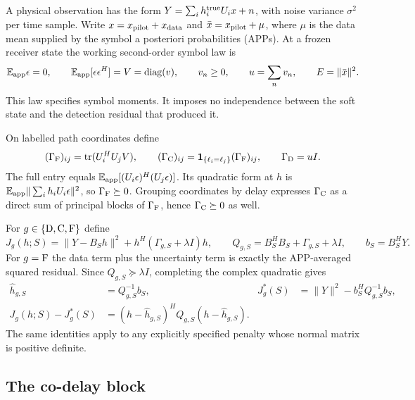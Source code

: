 A physical observation has the form
$Y=\sum_i h_i^{\rm true}U_ix+n$, with noise variance $\sigma^2$ per
time sample. Write $x=x_{\rm pilot}+x_{\rm data}$ and
$\bar x=x_{\rm pilot}+\mu$, where $\mu$ is the data mean supplied by the
symbol a posteriori probabilities (APPs). At a frozen receiver state
the working second-order symbol law is
\[
 \mathbb E_{\rm app}\epsilon=0,\qquad
 \mathbb E_{\rm app}[\epsilon\epsilon^H]
 =V=\operatorname{diag}(v),\qquad v_n\ge0,\qquad
 u=\sum_n v_n,\qquad E=\|\bar x\|^2 .
\]
This law specifies symbol moments. It imposes no independence between
the soft state and the detection residual that produced it.

On labelled path coordinates define
\[
 (\Gamma_{\rm F})_{ij}=\operatorname{tr}(U_i^HU_jV),\qquad
 (\Gamma_{\rm C})_{ij}
   =\mathbf1_{\{\ell_i=\ell_j\}}(\Gamma_{\rm F})_{ij},\qquad
 \Gamma_{\rm D}=uI .
\]
The full entry equals
$\mathbb E_{\rm app}[(U_i\epsilon)^H(U_j\epsilon)]$. Its quadratic
form at $h$ is $\mathbb E_{\rm app}\|\sum_i h_iU_i\epsilon\|^2$,
so $\Gamma_{\rm F}\succeq0$. Grouping coordinates by delay expresses
$\Gamma_{\rm C}$ as a direct sum of principal blocks of
$\Gamma_{\rm F}$, hence $\Gamma_{\rm C}\succeq0$ as well.

For $g\in\{{\rm D},{\rm C},{\rm F}\}$ define
\[
 J_g(h;S)=\|Y-B_Sh\|^2+h^H(\Gamma_{g,S}+\lambda I)h,\qquad
 Q_{g,S}=B_S^HB_S+\Gamma_{g,S}+\lambda I,\qquad b_S=B_S^HY .
\]
For $g={\rm F}$ the data term plus the uncertainty term is exactly the
APP-averaged squared residual. Since $Q_{g,S}\succeq\lambda I$,
completing the complex quadratic gives
\begin{align}
 \hat h_{g,S}&=Q_{g,S}^{-1}b_S,&
 J_g^*(S)&=\|Y\|^2-b_S^HQ_{g,S}^{-1}b_S, \label{eq:af-profile}\\
 J_g(h;S)-J_g^*(S)
   &=(h-\hat h_{g,S})^HQ_{g,S}(h-\hat h_{g,S}).
   \label{eq:af-square}
\end{align}
The same identities apply to any explicitly specified penalty whose
normal matrix is positive definite.

\subsection{The co-delay block}

